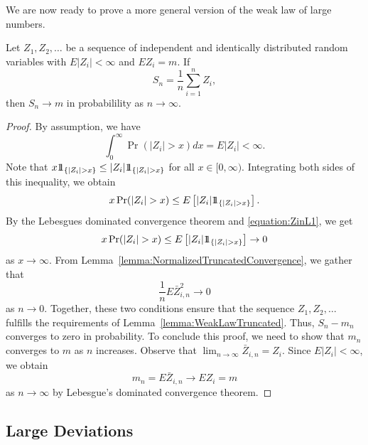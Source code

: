 We are now ready to prove a more general version of the weak law of large numbers.

\begin{theorem}
Let $Z_1, Z_2, \ldots$ be a sequence of independent and identically distributed random variables with $E |Z_i| < \infty$  and $E Z_i = m$.
If
\begin{equation*}
S_n = \frac{1}{n} \sum_{i=1}^n Z_i ,
\end{equation*}
then $S_n \rightarrow m$ in probabilility as $n \rightarrow \infty$.
\end{theorem}
\begin{proof}
By assumption, we have
\begin{equation} \label{equation:ZinL1}
\int_0^{\infty} \Pr (|Z_i| > x) dx = E |Z_i| < \infty .
\end{equation}
Note that $x \mathrm{1\!\!1}_{\{ |Z_i| > x \}} \leq |Z_i| \mathrm{1\!\!1}_{\{ |Z_i| > x \}}$ for all $x \in [0, \infty)$.
Integrating both sides of this inequality, we obtain
\begin{equation*}
x \Pr ( |Z_i| > x) \leq E \left[ |Z_i| \mathrm{1\!\!1}_{\{ |Z_i| > x \}} \right] .
\end{equation*}
By the Lebesgues dominated convergence theorem and \eqref{equation:ZinL1}, we get
\begin{equation*}
x \Pr ( |Z_i| > x) \leq E \left[ |Z_i| \mathrm{1\!\!1}_{\{ |Z_i| > x \}} \right]
\rightarrow 0
\end{equation*}
as $x \rightarrow \infty$.
From Lemma~\ref{lemma:NormalizedTruncatedConvergence}, we gather that
\begin{equation*}
\frac{1}{n} E \bar{Z}_{i,n}^2 \rightarrow 0
\end{equation*}
as $n \rightarrow 0$.
Together, these two conditions ensure that the sequence $Z_1, Z_2, \ldots$ fulfills the requirements of Lemma~\ref{lemma:WeakLawTruncated}.
Thus, $S_n - m_n$ converges to zero in probability.
To conclude this proof, we need to show that $m_n$ converges to $m$ as $n$ increases.
Observe that $\lim_{n \rightarrow \infty} \bar{Z}_{i,n} = Z_i$.
Since $E |Z_i| < \infty$, we obtain
\begin{equation*}
m_n = E \bar{Z}_{i,n} \rightarrow E Z_i = m
\end{equation*}
as $n \rightarrow \infty$ by Lebesgue's dominated convergence theorem.
\end{proof}


\subsection{Large Deviations}


